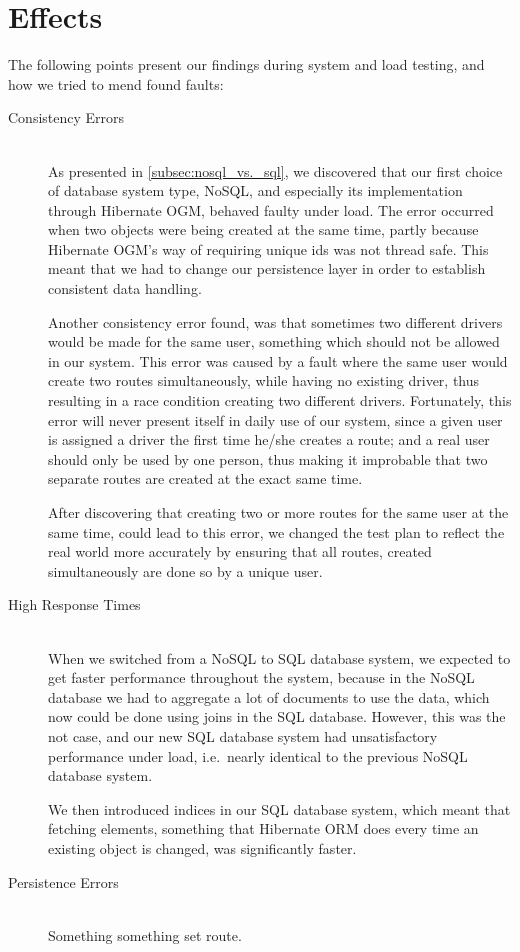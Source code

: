 \section{Effects}
The following points present our findings during system and load testing, and how we tried to mend found faults:
\begin{description}
    \item[Consistency Errors]\hfill \\
        As presented in \cref{subsec:nosql_vs._sql}, we discovered that our first choice of database system type, NoSQL, and especially its implementation through Hibernate OGM, behaved faulty under load.
        The error occurred when two objects were being created at the same time, partly because Hibernate OGM's way of requiring unique ids was not thread safe.
        This meant that we had to change our persistence layer in order to establish consistent data handling.

        Another consistency error found, was that sometimes two different drivers would be made for the same user, something which should not be allowed in our system.
        This error was caused by a fault where the same user would create two routes simultaneously, while having no existing driver, thus resulting in a race condition creating two different drivers.
        Fortunately, this error will never present itself in daily use of our system, since a given user is assigned a driver the first time he/she creates a route;
        and a real user should only be used by one person, thus making it improbable that two separate routes are created at the exact same time.

        After discovering that creating two or more routes for the same user at the same time, could lead to this error, we changed the test plan to reflect the real world more accurately by ensuring that all routes, created simultaneously are done so by a unique user.
    \item[High Response Times]\hfill \\
        When we switched from a NoSQL to SQL database system, we expected to get faster performance throughout the system, because in the NoSQL database we had to aggregate a lot of documents to use the data, which now could be done using joins in the SQL database.
        However, this was the not case, and our new SQL database system had unsatisfactory performance under load, i.e.~nearly identical to the previous NoSQL database system.

        We then introduced indices in our SQL database system, which meant that fetching elements, something that Hibernate ORM does every time an existing object is changed, was significantly faster.
    \item[Persistence Errors]\hfill \\
        Something something set route.
\end{description}
